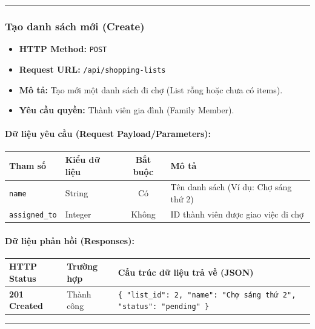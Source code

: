 \documentclass[12pt,a4paper]{article}
\begin{document}
\vskip 0.4cm
\noindent\rule{\textwidth}{0.3pt}
\vskip 0.4cm

\subsubsection{Tạo danh sách mới (Create)}
\begin{itemize}[leftmargin=*]
    \item \textbf{HTTP Method:} \texttt{POST}
    \item \textbf{Request URL:} \texttt{/api/shopping-lists}
    \item \textbf{Mô tả:} Tạo mới một danh sách đi chợ (List rỗng hoặc chưa có items).
    \item \textbf{Yêu cầu quyền:} Thành viên gia đình (Family Member).
\end{itemize}

\paragraph{Dữ liệu yêu cầu (Request Payload/Parameters):}
\begin{longtable}{|>{\raggedright\arraybackslash}p{2.8cm}|>{\raggedright\arraybackslash}p{2.2cm}|c|>{\raggedright\arraybackslash}p{7.0cm}|}
\hline
\textbf{Tham số} & \textbf{Kiểu dữ liệu} & \textbf{Bắt buộc} & \textbf{Mô tả} \\ \hline
\endhead
\texttt{name} & String & Có & Tên danh sách (Ví dụ: Chợ sáng thứ 2) \\ \hline
\texttt{assigned\_to} & Integer & Không & ID thành viên được giao việc đi chợ \\ \hline
\end{longtable}

\paragraph{Dữ liệu phản hồi (Responses):}
\begin{longtable}{|>{\raggedright\arraybackslash}p{2.8cm}|>{\raggedright\arraybackslash}p{3.2cm}|>{\raggedright\arraybackslash}p{8.0cm}|}
\hline
\textbf{HTTP Status} & \textbf{Trường hợp} & \textbf{Cấu trúc dữ liệu trả về (JSON)} \\ \hline
\endhead
\textbf{201 Created} & Thành công & \texttt{\{ "list\_id": 2, "name": "Chợ sáng thứ 2", "status": "pending" \}} \\ \hline
\end{longtable}

\vskip 0.4cm
\noindent\rule{\textwidth}{0.3pt}
\vskip 0.4cm
\end{document}
